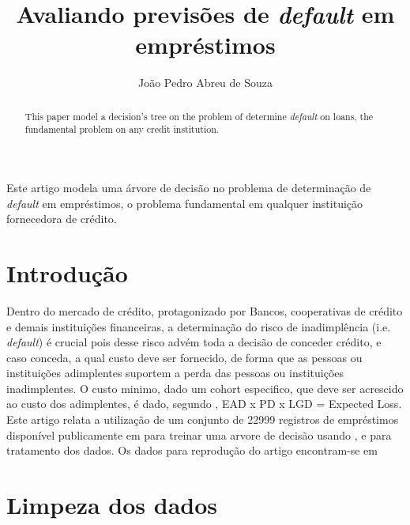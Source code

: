 \documentclass[12pt]{article}
\title{Avaliando previsões de \textit{default} em empréstimos}
\author{João Pedro Abreu de Souza\inst{1}}
\begin{document}
 

\maketitle

\begin{abstract}
  This paper model a decision's tree on the problem of determine \textit{default} on loans, the fundamental problem on any credit institution.
\end{abstract}
     
\begin{resumo} 
  Este artigo modela uma árvore de decisão no problema de determinação de \textit{default} em empréstimos, o problema fundamental em qualquer instituição fornecedora de crédito.
  
\end{resumo}


\section{Introdução}

Dentro do mercado de crédito, protagonizado por Bancos, cooperativas de crédito e demais instituições financeiras, a determinação do risco de inadimplência (i.e. \textit{default}) é crucial pois desse risco advém toda a decisão de conceder crédito, e caso conceda, a qual custo deve ser fornecido, de forma que as pessoas ou instituições adimplentes suportem a perda das pessoas ou instituições inadimplentes. O custo minimo, dado um cohort especifico, que deve ser acrescido ao custo dos adimplentes, é dado, segundo \cite{investopedia}, EAD x PD x LGD = Expected Loss. Este artigo relata a utilização de um conjunto de 22999 registros de empréstimos disponível publicamente em \cite{kaggle} para treinar uma arvore de decisão usando \cite{scikit}, \cite{pandas} e \cite{numpy} para tratamento dos dados. Os dados para reprodução do artigo encontram-se em \cite{repositorio}

\section{Limpeza dos dados} \label{sec:firstpage}
\end{document}
